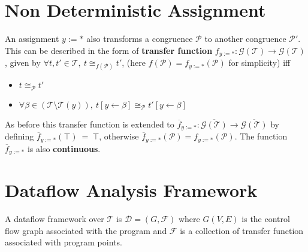 \section{Non Deterministic Assignment}
\label{sec:NonDeterministicAssignment}
An assignment $y := *$ also transforms a congruence $\mathcal P$ to another 
congruence $\mathcal P'$. This can be described in the form of \textbf{transfer function} 
$f_{y := *}:\mathcal G(\mathcal T) \to \mathcal G(\mathcal T)$, given by
$\forall t, t' \in \mathcal T,\ t \cong_{f(\mathcal P)} t'$, (here 
$f(\mathcal P) = f_{y := *}(\mathcal P)$ for simplicity) iff
\begin{itemize} \tightlist
    \item $t \cong_{\mathcal P} t'$
    \item $\forall \beta \in (\mathcal T \setminus \mathcal T(y)),\ t[y \leftarrow \beta] \cong_{\mathcal P} t'[y \leftarrow \beta]$
\end{itemize}
As before this transfer function is extended to 
$\overline{f}_{y := *} : \overline{\mathcal G(\mathcal T)} \to \overline{\mathcal G(\mathcal T)}$ 
by defining $\overline{f}_{y := *}(\top)\ =\ \top$, otherwise 
$\overline{f}_{y := *}(\mathcal P) = f_{y := *}(\mathcal P)$. The function 
$\overline{f}_{y := *}$ is also \textbf{continuous}.

\section{Dataflow Analysis Framework}
\label{sec:DataflowAnalysisFramework}
A dataflow framework over $\mathcal T$ is $\mathcal D = (G, \mathcal F)$ where 
$G(V, E)$ is the control flow graph associated with the program and $\mathcal F$ 
is a collection of transfer function associated with program points.

